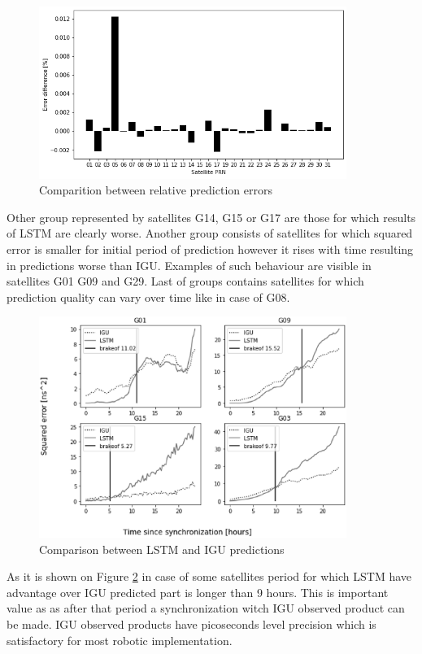 \documentclass{kybernetika}
\begin{document}
\begin{figure}[ht] 
\centering
	\includegraphics[width=10cm]{figures/rel_err_diff}
\caption{Comparition between relative prediction errors}
\label{fig:_relative_error_comparition}
\end{figure}

Other group represented by satellites G14, G15 or G17 are those  for which results of LSTM 
are clearly worse. Another group consists of satellites for which 
squared error is smaller for initial period of prediction however it rises with time resulting
in predictions worse than IGU. Examples of such behaviour are visible in satellites G01
G09 and G29. Last of groups contains satellites for which prediction quality can vary over
time like in case of G08.
\begin{figure}[ht] 
\centering
	\includegraphics[width=10cm]{figures/brakeoff_compare}
\caption{Comparison between LSTM and IGU predictions}
\label{fig:cutoff}
\end{figure}
As it is shown on Figure \ref{fig:cutoff} in case of some satellites period for which LSTM
have advantage over IGU predicted part is longer than 9 hours. This is important value as 
as after that period a synchronization witch IGU observed product can be made.
IGU observed products have picoseconds level precision which is satisfactory for most 
robotic implementation.
\end{document}
